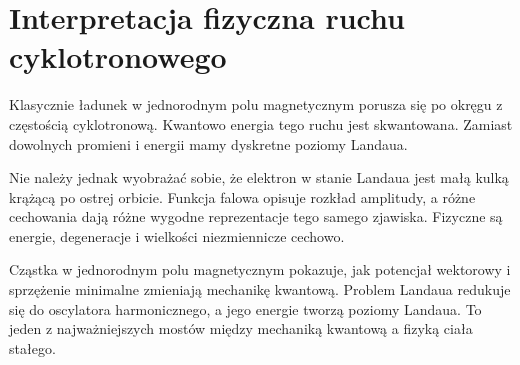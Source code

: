 \section{Interpretacja fizyczna ruchu cyklotronowego}

Klasycznie ładunek w jednorodnym polu magnetycznym porusza się po okręgu z częstością cyklotronową. Kwantowo energia tego ruchu jest skwantowana. Zamiast dowolnych promieni i energii mamy dyskretne poziomy Landaua.

Nie należy jednak wyobrażać sobie, że elektron w stanie Landaua jest małą kulką krążącą po ostrej orbicie. Funkcja falowa opisuje rozkład amplitudy, a różne cechowania dają różne wygodne reprezentacje tego samego zjawiska. Fizyczne są energie, degeneracje i wielkości niezmiennicze cechowo.

\begin{summarybox}
Cząstka w jednorodnym polu magnetycznym pokazuje, jak potencjał wektorowy i sprzężenie minimalne zmieniają mechanikę kwantową. Problem Landaua redukuje się do oscylatora harmonicznego, a jego energie tworzą poziomy Landaua. To jeden z najważniejszych mostów między mechaniką kwantową a fizyką ciała stałego.
\end{summarybox}
